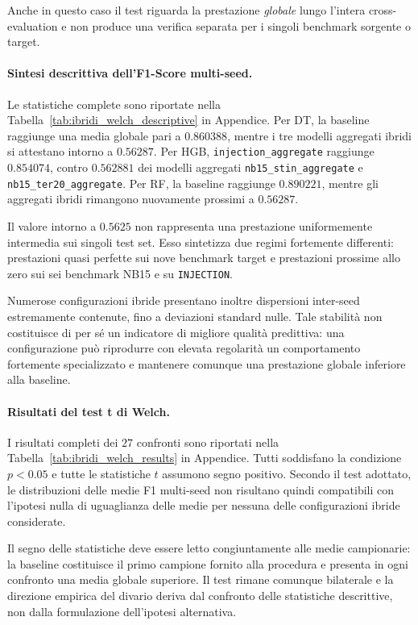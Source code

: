 Anche in questo caso il test riguarda la prestazione \emph{globale} lungo l'intera cross-evaluation e non produce una verifica separata per i singoli benchmark sorgente o target.

\paragraph{Sintesi descrittiva dell'F1-Score multi-seed.}
Le statistiche complete sono riportate nella Tabella~\ref{tab:ibridi_welch_descriptive} in Appendice. 
Per DT, la baseline raggiunge una media globale pari a $0.860388$, mentre i tre modelli aggregati ibridi si attestano intorno a $0.56287$. 
Per HGB, \texttt{injection\_aggregate} raggiunge $0.854074$, contro $0.562881$ dei modelli aggregati \texttt{nb15\_stin\_aggregate} e \newline \texttt{nb15\_ter20\_aggregate}. 
Per RF, la baseline raggiunge $0.890221$, mentre gli aggregati ibridi rimangono nuovamente prossimi a $0.56287$.

Il valore intorno a $0.5625$ non rappresenta una prestazione uniformemente intermedia sui singoli test set. 
Esso sintetizza due regimi fortemente differenti: prestazioni quasi perfette sui nove benchmark target e prestazioni prossime allo zero sui sei benchmark NB15 e su \texttt{INJECTION}.

Numerose configurazioni ibride presentano inoltre dispersioni inter-seed estremamente contenute, fino a deviazioni standard nulle. 
Tale stabilità non costituisce di per sé un indicatore di migliore qualità predittiva: una configurazione può riprodurre con elevata regolarità un comportamento fortemente specializzato e mantenere comunque una prestazione globale inferiore alla baseline.

\paragraph{Risultati del test t di Welch.}
I risultati completi dei $27$ confronti sono riportati nella Tabella~\ref{tab:ibridi_welch_results} in Appendice. 
Tutti soddisfano la condizione $p<0.05$ e tutte le statistiche $t$ assumono segno positivo.
Secondo il test adottato, le distribuzioni delle medie F1 multi-seed non risultano quindi compatibili con l'ipotesi nulla di uguaglianza delle medie per nessuna delle configurazioni ibride considerate.

Il segno delle statistiche deve essere letto congiuntamente alle medie campionarie: la baseline costituisce il primo campione fornito alla procedura e presenta in ogni confronto una media globale superiore. 
Il test rimane comunque bilaterale e la direzione empirica del divario deriva dal confronto delle statistiche descrittive, non dalla formulazione dell'ipotesi alternativa.


